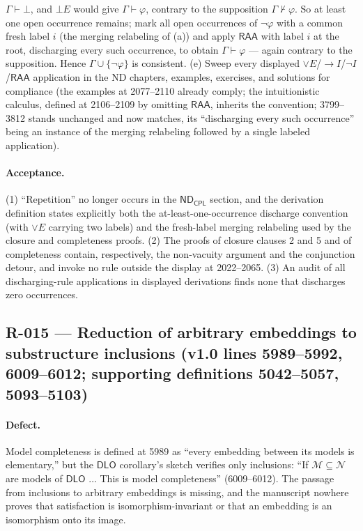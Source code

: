 \(\Gamma\vdash\bot\), and \(\bot E\) would give \(\Gamma\vdash\varphi\),
contrary to the supposition \(\Gamma\nvdash\varphi\).  So at least one open
occurrence remains; mark all open occurrences of \(\neg\varphi\) with a
common fresh label \(i\) (the merging relabeling of (a)) and apply
\(\mathsf{RAA}\) with label \(i\) at the root, discharging every such
occurrence, to obtain \(\Gamma\vdash\varphi\) --- again contrary to
the supposition.  Hence \(\Gamma\cup\{\neg\varphi\}\) is consistent.
(e) Sweep every displayed \(\lor E\)/\(\to I\)/\(\neg I\)/\(\mathsf{RAA}\)
application in the ND chapters, examples, exercises, and solutions for
compliance (the examples at 2077--2110 already comply; the intuitionistic
calculus, defined at 2106--2109 by omitting \(\mathsf{RAA}\), inherits the
convention; 3799--3812 stands unchanged and now matches, its ``discharging
every such occurrence'' being an instance of the merging relabeling
followed by a single labeled application).

\paragraph{Acceptance.} (1) ``Repetition'' no longer occurs in the
\(\mathsf{ND}_{\mathsf{CPL}}\) section, and the derivation definition
states explicitly both the at-least-one-occurrence discharge convention
(with \(\lor E\) carrying two labels) and the fresh-label merging
relabeling used by the closure and completeness proofs.
(2) The proofs of closure clauses 2 and 5 and of completeness contain,
respectively, the non-vacuity argument and the conjunction detour, and
invoke no rule outside the display at 2022--2065.  (3) An audit of all
discharging-rule applications in displayed derivations finds none that
discharges zero occurrences.

\subsection*{R-015 --- Reduction of arbitrary embeddings to substructure inclusions (v1.0 lines 5989--5992, 6009--6012; supporting definitions 5042--5057, 5093--5103)}

\paragraph{Defect.} Model completeness is defined at 5989 as ``every
embedding between its models is elementary,'' but the \(\mathsf{DLO}\)
corollary's sketch verifies only inclusions: ``If
\(\mathcal M\subseteq\mathcal N\) are models of \(\mathsf{DLO}\)
\(\ldots\) This is model completeness'' (6009--6012).  The passage from
inclusions to arbitrary embeddings is missing, and the manuscript nowhere
proves that satisfaction is isomorphism-invariant or that an embedding is
an isomorphism onto its image.

